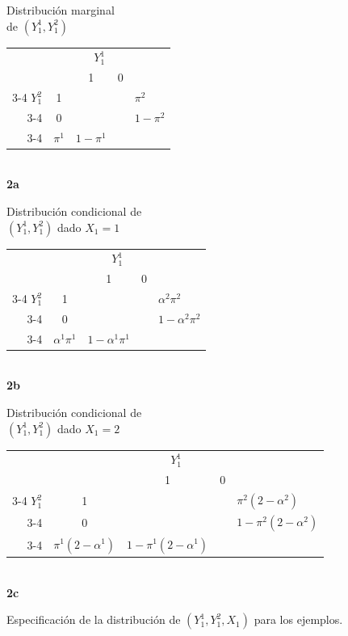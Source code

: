 \documentclass[12pt,a4paper]{article}
\begin{document}
\begin{figure}[ht]
\centering
\renewcommand{\arraystretch}{1.5}
\begin{minipage}{0.32\textwidth}
\centering
\small Distribución marginal\\de $(Y_1^1, Y_1^2)$\\[1ex]
\begin{tabular}{r c|c|c|l}
  \multicolumn{2}{c}{} & \multicolumn{2}{c}{$Y_1^1$} & \\
  & & \multicolumn{1}{c}{1} & \multicolumn{1}{c}{0} & \\
  \cline{3-4}
  $Y_1^2$ & 1 & & & $\pi^2$ \\
  \cline{3-4}
  & 0 & & & $1-\pi^2$ \\
  \cline{3-4}
  \multicolumn{2}{c}{} & \multicolumn{1}{c}{$\pi^1$} & \multicolumn{1}{c}{$1-\pi^1$} &
\end{tabular}\\[1ex]
\textbf{2a}
\end{minipage}%
\begin{minipage}{0.32\textwidth}
\centering
\small Distribución condicional de\\$(Y_1^1, Y_1^2)$ dado $X_1=1$\\[1ex]
\begin{tabular}{r c|c|c|l}
  \multicolumn{2}{c}{} & \multicolumn{2}{c}{$Y_1^1$} & \\
  & & \multicolumn{1}{c}{1} & \multicolumn{1}{c}{0} & \\
  \cline{3-4}
  $Y_1^2$ & 1 & & & $\alpha^2\pi^2$ \\
  \cline{3-4}
  & 0 & & & $1-\alpha^2\pi^2$ \\
  \cline{3-4}
  \multicolumn{2}{c}{} & \multicolumn{1}{c}{$\alpha^1\pi^1$} & \multicolumn{1}{c}{$1-\alpha^1\pi^1$} &
\end{tabular}\\[1ex]
\textbf{2b}
\end{minipage}%
\begin{minipage}{0.32\textwidth}
\centering
\small Distribución condicional de\\$(Y_1^1, Y_1^2)$ dado $X_1=2$\\[1ex]
\begin{tabular}{r c|c|c|l}
  \multicolumn{2}{c}{} & \multicolumn{2}{c}{$Y_1^1$} & \\
  & & \multicolumn{1}{c}{1} & \multicolumn{1}{c}{0} & \\
  \cline{3-4}
  $Y_1^2$ & 1 & & & $\pi^2(2-\alpha^2)$ \\
  \cline{3-4}
  & 0 & & & $1-\pi^2(2-\alpha^2)$ \\
  \cline{3-4}
  \multicolumn{2}{c}{} & \multicolumn{1}{c}{$\pi^1(2-\alpha^1)$} & \multicolumn{1}{c}{$1-\pi^1(2-\alpha^1)$} &
\end{tabular}\\[1ex]
\textbf{2c}
\end{minipage}
\caption{Especificación de la distribución de $(Y_1^1, Y_1^2, X_1)$ para los ejemplos.}
\end{figure}
\end{document}
